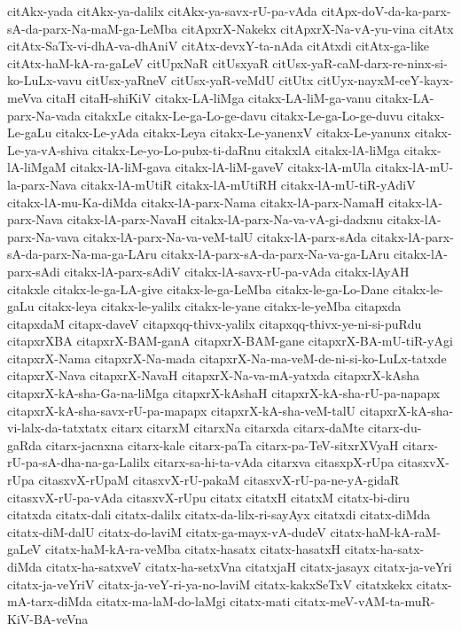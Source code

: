 {citAkx-yada
citAkx-ya-dalilx
citAkx-ya-savx-rU-pa-vAda
citApx-doV-da-ka-parx-sA-da-parx-Na-maM-ga-LeMba
citApxrX-Nakekx
citApxrX-Na-vA-yu-vina
citAtx
citAtx-SaTx-vi-dhA-va-dhAniV
citAtx-devxY-ta-nAda
citAtxdi
citAtx-ga-like
citAtx-haM-kA-ra-gaLeV
citUpxNaR
citUsxyaR
citUsx-yaR-caM-darx-re-ninx-si-ko-LuLx-vavu
citUsx-yaRneV
citUsx-yaR-veMdU
citUtx
citUyx-nayxM-ceY-kayx-meVva
citaH
citaH-shiKiV
citakx-LA-liMga
citakx-LA-liM-ga-vanu
citakx-LA-parx-Na-vada
citakxLe
citakx-Le-ga-Lo-ge-davu
citakx-Le-ga-Lo-ge-duvu
citakx-Le-gaLu
citakx-Le-yAda
citakx-Leya
citakx-Le-yanenxV
citakx-Le-yanunx
citakx-Le-ya-vA-shiva
citakx-Le-yo-Lo-pubx-ti-daRnu
citakxlA
citakx-lA-liMga
citakx-lA-liMgaM
citakx-lA-liM-gava
citakx-lA-liM-gaveV
citakx-lA-mUla
citakx-lA-mU-la-parx-Nava
citakx-lA-mUtiR
citakx-lA-mUtiRH
citakx-lA-mU-tiR-yAdiV
citakx-lA-mu-Ka-diMda
citakx-lA-parx-Nama
citakx-lA-parx-NamaH
citakx-lA-parx-Nava
citakx-lA-parx-NavaH
citakx-lA-parx-Na-va-vA-gi-dadxnu
citakx-lA-parx-Na-vava
citakx-lA-parx-Na-va-veM-talU
citakx-lA-parx-sAda
citakx-lA-parx-sA-da-parx-Na-ma-ga-LAru
citakx-lA-parx-sA-da-parx-Na-va-ga-LAru
citakx-lA-parx-sAdi
citakx-lA-parx-sAdiV
citakx-lA-savx-rU-pa-vAda
citakx-lAyAH
citakxle
citakx-le-ga-LA-give
citakx-le-ga-LeMba
citakx-le-ga-Lo-Dane
citakx-le-gaLu
citakx-leya
citakx-le-yalilx
citakx-le-yane
citakx-le-yeMba
citapxda
citapxdaM
citapx-daveV
citapxqq-thivx-yalilx
citapxqq-thivx-ye-ni-si-puRdu
citapxrXBA
citapxrX-BAM-ganA
citapxrX-BAM-gane
citapxrX-BA-mU-tiR-yAgi
citapxrX-Nama
citapxrX-Na-mada
citapxrX-Na-ma-veM-de-ni-si-ko-LuLx-tatxde
citapxrX-Nava
citapxrX-NavaH
citapxrX-Na-va-mA-yatxda
citapxrX-kAsha
citapxrX-kA-sha-Ga-na-liMga
citapxrX-kAshaH
citapxrX-kA-sha-rU-pa-napapx
citapxrX-kA-sha-savx-rU-pa-mapapx
citapxrX-kA-sha-veM-talU
citapxrX-kA-sha-vi-lalx-da-tatxtatx
citarx
citarxM
citarxNa
citarxda
citarx-daMte
citarx-du-gaRda
citarx-jacnxna
citarx-kale
citarx-paTa
citarx-pa-TeV-sitxrXVyaH
citarx-rU-pa-sA-dha-na-ga-Lalilx
citarx-sa-hi-ta-vAda
citarxva
citasxpX-rUpa
citasxvX-rUpa
citasxvX-rUpaM
citasxvX-rU-pakaM
citasxvX-rU-pa-ne-yA-gidaR
citasxvX-rU-pa-vAda
citasxvX-rUpu
citatx
citatxH
citatxM
citatx-bi-diru
citatxda
citatx-dali
citatx-dalilx
citatx-da-lilx-ri-sayAyx
citatxdi
citatx-diMda
citatx-diM-dalU
citatx-do-laviM
citatx-ga-mayx-vA-dudeV
citatx-haM-kA-raM-gaLeV
citatx-haM-kA-ra-veMba
citatx-hasatx
citatx-hasatxH
citatx-ha-satx-diMda
citatx-ha-satxveV
citatx-ha-setxVna
citatxjaH
citatx-jasayx
citatx-ja-veYri
citatx-ja-veYriV
citatx-ja-veY-ri-ya-no-laviM
citatx-kakxSeTxV
citatxkekx
citatx-mA-tarx-diMda
citatx-ma-laM-do-laMgi
citatx-mati
citatx-meV-vAM-ta-muR-KiV-BA-veVna
}
